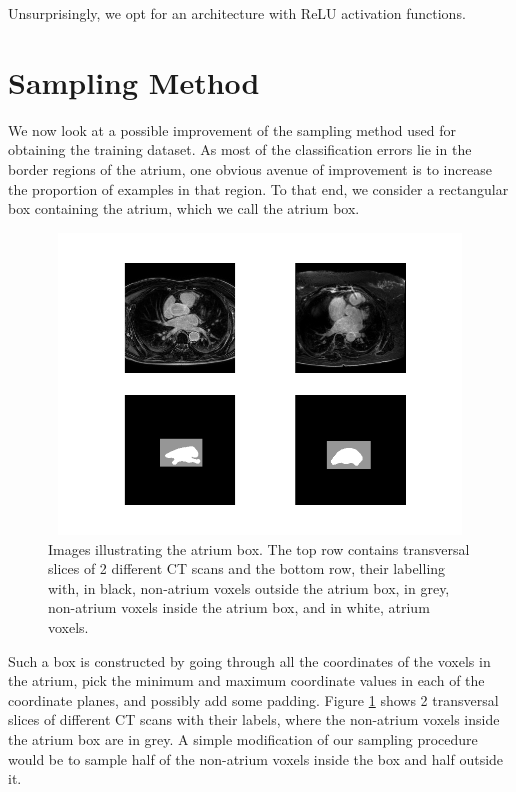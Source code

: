 \noindent Unsurprisingly, we opt for an architecture with ReLU activation functions.

\newpage

\section{Sampling Method}

\noindent We now look at a possible improvement of the sampling method used for obtaining the training dataset. As most of the classification errors lie in the border regions of the atrium, one obvious avenue of improvement is to increase the proportion of examples in that region. To that end, we consider a rectangular box containing the atrium, which we call the atrium box.\\

\begin{figure}
\centering
\includegraphics[trim=2.5cm 1.5cm 2cm 1.5cm, clip=true, height=80mm, width=150mm]{Chapter3/sampling_example.png}
\caption{Images illustrating the atrium box. The top row contains transversal slices of 2 different CT scans and the bottom row, their labelling with, in black, non-atrium voxels outside the atrium box, in grey, non-atrium voxels inside the atrium box, and in white, atrium voxels.}
\label{sampling_example}
\end{figure}

\noindent Such a box is constructed by going through all the coordinates of the voxels in the atrium, pick the minimum and maximum coordinate values in each of the coordinate planes, and possibly add some padding. Figure \ref{sampling_example} shows 2 transversal slices of different CT scans with their labels, where the non-atrium voxels inside the atrium box are in grey. A simple modification of our sampling procedure would be to sample half of the non-atrium voxels inside the box and half outside it.  \\

